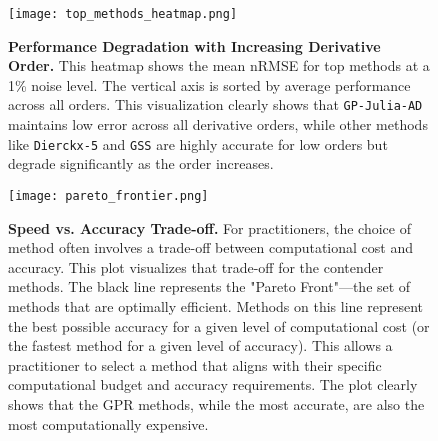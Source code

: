 
\begin{figure}[htbp]
\centering
\texttt{[image: top\_methods\_heatmap.png]}
\caption{\textbf{Performance Degradation with Increasing Derivative Order.} This heatmap shows the mean nRMSE for top methods at a 1\% noise level. The vertical axis is sorted by average performance across all orders. This visualization clearly shows that \texttt{GP-Julia-AD} maintains low error across all derivative orders, while other methods like \texttt{Dierckx-5} and \texttt{GSS} are highly accurate for low orders but degrade significantly as the order increases.}
\label{fig:heatmap}
\end{figure}

\begin{figure}[htbp]
\centering
\texttt{[image: pareto\_frontier.png]}
\caption{\textbf{Speed vs. Accuracy Trade-off.} For practitioners, the choice of method often involves a trade-off between computational cost and accuracy. This plot visualizes that trade-off for the contender methods. The black line represents the "Pareto Front"—the set of methods that are optimally efficient. Methods on this line represent the best possible accuracy for a given level of computational cost (or the fastest method for a given level of accuracy). This allows a practitioner to select a method that aligns with their specific computational budget and accuracy requirements. The plot clearly shows that the GPR methods, while the most accurate, are also the most computationally expensive.}
\label{fig:pareto}
\end{figure}
